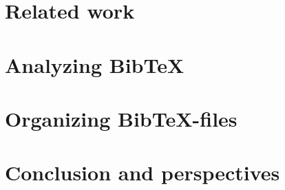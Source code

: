 \documentclass[twoside,11pt,openright,a4paper]{report}
\newcommand{\bibtex}{Bib{\TeX}}
\begin{document}
\chapter{Related work}
\label{ch:related}


\chapter{Analyzing {\bibtex}}

\chapter{Organizing {\bibtex}-files}

\chapter{Conclusion and perspectives}
\label{ch:conclusion}

\todo{\dots}


\printbibliography{}
\end{document}

